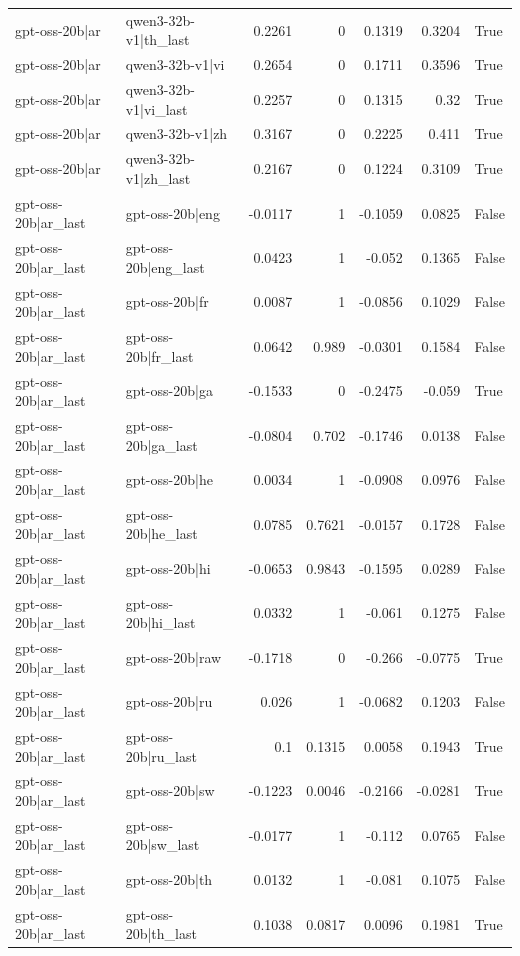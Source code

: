 \begin{table}
\begin{tabular}{l l r r r r l}
gpt-oss-20b|ar & qwen3-32b-v1|th_last & 0.2261 & 0 & 0.1319 & 0.3204 & True \\
gpt-oss-20b|ar & qwen3-32b-v1|vi & 0.2654 & 0 & 0.1711 & 0.3596 & True \\
gpt-oss-20b|ar & qwen3-32b-v1|vi_last & 0.2257 & 0 & 0.1315 & 0.32 & True \\
gpt-oss-20b|ar & qwen3-32b-v1|zh & 0.3167 & 0 & 0.2225 & 0.411 & True \\
gpt-oss-20b|ar & qwen3-32b-v1|zh_last & 0.2167 & 0 & 0.1224 & 0.3109 & True \\
gpt-oss-20b|ar_last & gpt-oss-20b|eng & -0.0117 & 1 & -0.1059 & 0.0825 & False \\
gpt-oss-20b|ar_last & gpt-oss-20b|eng_last & 0.0423 & 1 & -0.052 & 0.1365 & False \\
gpt-oss-20b|ar_last & gpt-oss-20b|fr & 0.0087 & 1 & -0.0856 & 0.1029 & False \\
gpt-oss-20b|ar_last & gpt-oss-20b|fr_last & 0.0642 & 0.989 & -0.0301 & 0.1584 & False \\
gpt-oss-20b|ar_last & gpt-oss-20b|ga & -0.1533 & 0 & -0.2475 & -0.059 & True \\
gpt-oss-20b|ar_last & gpt-oss-20b|ga_last & -0.0804 & 0.702 & -0.1746 & 0.0138 & False \\
gpt-oss-20b|ar_last & gpt-oss-20b|he & 0.0034 & 1 & -0.0908 & 0.0976 & False \\
gpt-oss-20b|ar_last & gpt-oss-20b|he_last & 0.0785 & 0.7621 & -0.0157 & 0.1728 & False \\
gpt-oss-20b|ar_last & gpt-oss-20b|hi & -0.0653 & 0.9843 & -0.1595 & 0.0289 & False \\
gpt-oss-20b|ar_last & gpt-oss-20b|hi_last & 0.0332 & 1 & -0.061 & 0.1275 & False \\
gpt-oss-20b|ar_last & gpt-oss-20b|raw & -0.1718 & 0 & -0.266 & -0.0775 & True \\
gpt-oss-20b|ar_last & gpt-oss-20b|ru & 0.026 & 1 & -0.0682 & 0.1203 & False \\
gpt-oss-20b|ar_last & gpt-oss-20b|ru_last & 0.1 & 0.1315 & 0.0058 & 0.1943 & True \\
gpt-oss-20b|ar_last & gpt-oss-20b|sw & -0.1223 & 0.0046 & -0.2166 & -0.0281 & True \\
gpt-oss-20b|ar_last & gpt-oss-20b|sw_last & -0.0177 & 1 & -0.112 & 0.0765 & False \\
gpt-oss-20b|ar_last & gpt-oss-20b|th & 0.0132 & 1 & -0.081 & 0.1075 & False \\
gpt-oss-20b|ar_last & gpt-oss-20b|th_last & 0.1038 & 0.0817 & 0.0096 & 0.1981 & True \\

\end{tabular}
\end{table}
